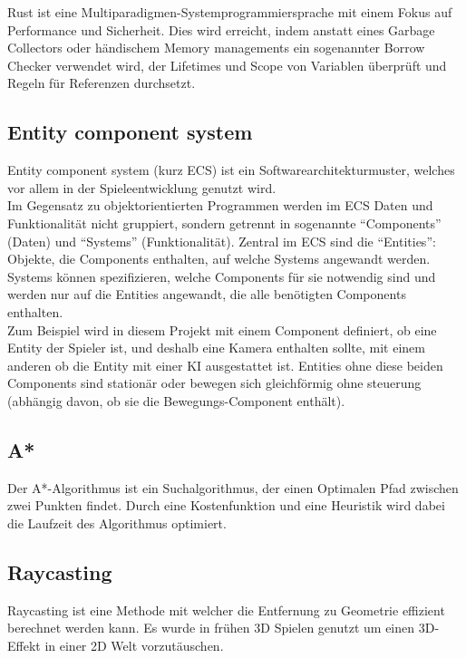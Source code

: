 \documentclass[a4paper,titlepage]{article}
\begin{document}
    Rust ist eine Multiparadigmen-Systemprogrammiersprache mit einem Fokus auf Performance und Sicherheit. Dies wird erreicht, indem anstatt eines Garbage Collectors oder händischem Memory managements ein sogenannter Borrow Checker verwendet wird, der Lifetimes und Scope von Variablen überprüft und Regeln für Referenzen durchsetzt.
    
    \subsection{Entity component system}
    
    Entity component system (kurz ECS) ist ein Softwarearchitekturmuster, welches vor allem in der Spieleentwicklung genutzt wird.\\
    Im Gegensatz zu objektorientierten Programmen werden im ECS Daten und Funktionalität nicht gruppiert, sondern getrennt in sogenannte ``Components'' (Daten) und ``Systems'' (Funktionalität).
    Zentral im ECS sind die ``Entities'': Objekte, die Components enthalten, auf welche Systems angewandt werden.\\
    Systems können spezifizieren, welche Components für sie notwendig sind und werden nur auf die Entities angewandt, die alle benötigten Components enthalten.\\
    Zum Beispiel wird in diesem Projekt mit einem Component definiert, ob eine Entity der Spieler ist, und deshalb eine Kamera enthalten sollte, mit einem anderen ob die Entity mit einer KI ausgestattet ist. Entities ohne diese beiden Components sind stationär oder bewegen sich gleichförmig ohne steuerung (abhängig davon, ob sie die Bewegungs-Component enthält).
    
    \subsection{A*}
    
    Der A*-Algorithmus ist ein Suchalgorithmus, der einen Optimalen Pfad zwischen zwei Punkten findet. Durch eine Kostenfunktion und eine Heuristik wird dabei die Laufzeit des Algorithmus optimiert.
    
    \subsection{Raycasting}
    
    Raycasting ist eine Methode mit welcher die Entfernung zu Geometrie effizient berechnet werden kann. Es wurde in frühen 3D Spielen genutzt um einen 3D-Effekt in einer 2D Welt vorzutäuschen.
    
\end{document}
